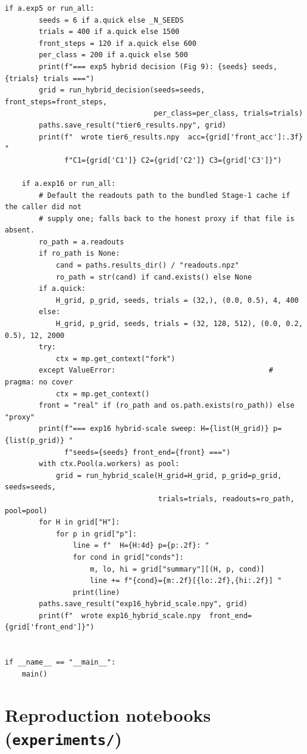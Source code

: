\begin{lstlisting}[caption={mrl\_trace/hybrid.py},label={lst:siox-src-hybrid}]
    if a.exp5 or run_all:
        seeds = 6 if a.quick else _N_SEEDS
        trials = 400 if a.quick else 1500
        front_steps = 120 if a.quick else 600
        per_class = 200 if a.quick else 500
        print(f"=== exp5 hybrid decision (Fig 9): {seeds} seeds, {trials} trials ===")
        grid = run_hybrid_decision(seeds=seeds, front_steps=front_steps,
                                   per_class=per_class, trials=trials)
        paths.save_result("tier6_results.npy", grid)
        print(f"  wrote tier6_results.npy  acc={grid['front_acc']:.3f} "
              f"C1={grid['C1']} C2={grid['C2']} C3={grid['C3']}")

    if a.exp16 or run_all:
        # Default the readouts path to the bundled Stage-1 cache if the caller did not
        # supply one; falls back to the honest proxy if that file is absent.
        ro_path = a.readouts
        if ro_path is None:
            cand = paths.results_dir() / "readouts.npz"
            ro_path = str(cand) if cand.exists() else None
        if a.quick:
            H_grid, p_grid, seeds, trials = (32,), (0.0, 0.5), 4, 400
        else:
            H_grid, p_grid, seeds, trials = (32, 128, 512), (0.0, 0.2, 0.5), 12, 2000
        try:
            ctx = mp.get_context("fork")
        except ValueError:                                    # pragma: no cover
            ctx = mp.get_context()
        front = "real" if (ro_path and os.path.exists(ro_path)) else "proxy"
        print(f"=== exp16 hybrid-scale sweep: H={list(H_grid)} p={list(p_grid)} "
              f"seeds={seeds} front_end={front} ===")
        with ctx.Pool(a.workers) as pool:
            grid = run_hybrid_scale(H_grid=H_grid, p_grid=p_grid, seeds=seeds,
                                    trials=trials, readouts=ro_path, pool=pool)
        for H in grid["H"]:
            for p in grid["p"]:
                line = f"  H={H:4d} p={p:.2f}: "
                for cond in grid["conds"]:
                    m, lo, hi = grid["summary"][(H, p, cond)]
                    line += f"{cond}={m:.2f}[{lo:.2f},{hi:.2f}] "
                print(line)
        paths.save_result("exp16_hybrid_scale.npy", grid)
        print(f"  wrote exp16_hybrid_scale.npy  front_end={grid['front_end']}")


if __name__ == "__main__":
    main()
\end{lstlisting}

\section{Reproduction notebooks (\texttt{experiments/})}
\label{app:siox-nb}


